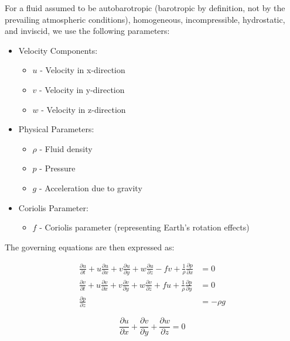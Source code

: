 \documentclass{article}
\begin{document}
For a fluid assumed to be autobarotropic (barotropic by definition, not by the prevailing atmospheric conditions), homogeneous, incompressible, hydrostatic, and inviscid, we use the following parameters:

\begin{itemize}
    \item Velocity Components:
    \begin{itemize}
        \item $u$ - Velocity in x-direction
        \item $v$ - Velocity in y-direction
        \item $w$ - Velocity in z-direction
    \end{itemize}
    
    \item Physical Parameters:
    \begin{itemize}
        \item $\rho$ - Fluid density
        \item $p$ - Pressure
        \item $g$ - Acceleration due to gravity
    \end{itemize}
    
    \item Coriolis Parameter:
    \begin{itemize}
        \item $f$ - Coriolis parameter (representing Earth's rotation effects)
    \end{itemize}
\end{itemize}

The governing equations are then expressed as:

\begin{align}
\frac{\partial u}{\partial t} + u\frac{\partial u}{\partial x} + v\frac{\partial u}{\partial y} + w\frac{\partial u}{\partial z} - fv + \frac{1}{\rho}\frac{\partial p}{\partial x} &= 0 \label{eq:35} \\
\frac{\partial v}{\partial t} + u\frac{\partial v}{\partial x} + v\frac{\partial v}{\partial y} + w\frac{\partial v}{\partial z} + fu + \frac{1}{\rho}\frac{\partial p}{\partial y} &= 0 \label{eq:36} \\
\frac{\partial p}{\partial z} &= -\rho g \label{eq:37}
\end{align}

\begin{equation}
\frac{\partial u}{\partial x} + \frac{\partial v}{\partial y} + \frac{\partial w}{\partial z} = 0
\label{eq:38}
\end{equation}
\end{document}
